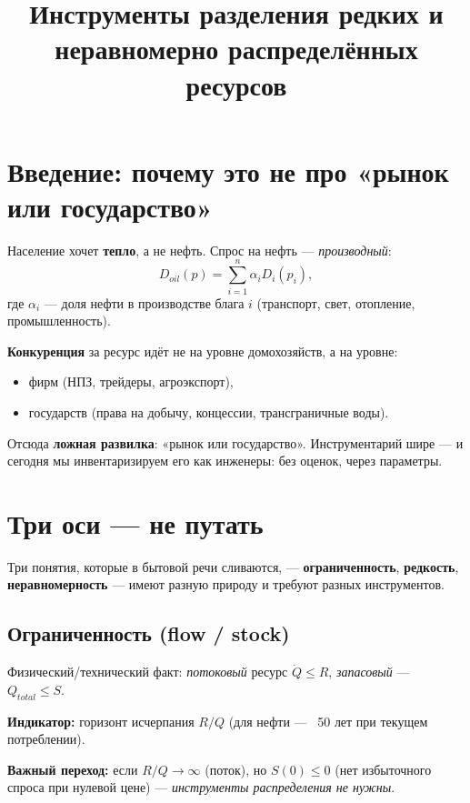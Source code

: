 \documentclass[12pt]{article}
\title{\textbf{Инструменты разделения редких и неравномерно распределённых ресурсов}}
\author{}
\date{}
\begin{document}
\maketitle
\thispagestyle{fancy}

\section{Введение: почему это не про «рынок или государство»}

Население хочет \textbf{тепло}, а не нефть. Спрос на нефть — \emph{производный}:
\begin{equation}\label{eq:derived}
D_{oil}(p) = \sum_{i=1}^{n} \alpha_i D_i(p_i),
\end{equation}
где $\alpha_i$ — доля нефти в производстве блага $i$ (транспорт, свет, отопление, промышленность).

\textbf{Конкуренция} за ресурс идёт не на уровне домохозяйств, а на уровне:
\begin{itemize}
\item фирм (НПЗ, трейдеры, агроэкспорт),
\item государств (права на добычу, концессии, трансграничные воды).
\end{itemize}

Отсюда \textbf{ложная развилка}: «рынок или государство». Инструментарий шире — и сегодня мы инвентаризируем его как инженеры: без оценок, через параметры.

\section{Три оси — не путать}

Три понятия, которые в бытовой речи сливаются, — \textbf{ограниченность}, \textbf{редкость}, \textbf{неравномерность} — имеют разную природу и требуют разных инструментов.

\subsection{Ограниченность (flow / stock)}
Физический/технический факт: \emph{потоковый} ресурс $\dot{Q} \le R$, \emph{запасовый} — $Q_{total} \le S$.

\textbf{Индикатор:} горизонт исчерпания $R/Q$ (для нефти — ~50 лет при текущем потреблении).

\textbf{Важный переход:} если $R/Q \to \infty$ (поток), но $S(0) \le 0$ (нет избыточного спроса при нулевой цене) — \emph{инструменты распределения не нужны}.
\end{document}
